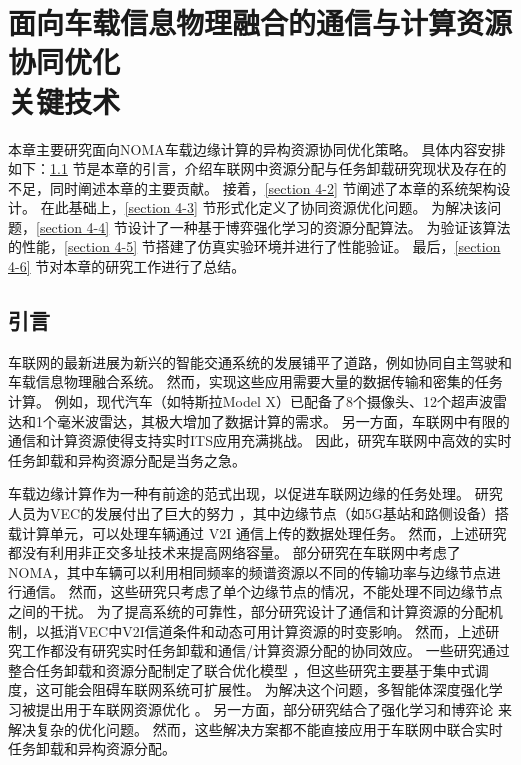 \chapter[面向车载信息物理融合的通信与计算资源协同优化关键技术]{面向车载信息物理融合的通信与计算资源协同优化\\关键技术}
本章主要研究面向NOMA车载边缘计算的异构资源协同优化策略。
具体内容安排如下：\ref{section 4-1} 节是本章的引言，介绍车联网中资源分配与任务卸载研究现状及存在的不足，同时阐述本章的主要贡献。
接着，\ref{section 4-2} 节阐述了本章的系统架构设计。
在此基础上，\ref{section 4-3} 节形式化定义了协同资源优化问题。
为解决该问题，\ref{section 4-4} 节设计了一种基于博弈强化学习的资源分配算法。
为验证该算法的性能，\ref{section 4-5} 节搭建了仿真实验环境并进行了性能验证。
最后，\ref{section 4-6} 节对本章的研究工作进行了总结。
\section{引言}\label{section 4-1}

车联网的最新进展为新兴的智能交通系统的发展铺平了道路，例如协同自主驾驶\cite{bagheri20215g}和车载信息物理融合系统\cite{mugabarigira2023context}。
然而，实现这些应用需要大量的数据传输和密集的任务计算。
例如，现代汽车（如特斯拉Model X）已配备了8个摄像头、12个超声波雷达和1个毫米波雷达，其极大增加了数据计算的需求。
另一方面，车联网中有限的通信和计算资源使得支持实时ITS应用充满挑战。
因此，研究车联网中高效的实时任务卸载和异构资源分配是当务之急。

车载边缘计算\cite{lang2022cooperative}作为一种有前途的范式出现，以促进车联网边缘的任务处理。
研究人员为VEC的发展付出了巨大的努力 \cite{liu2021fog, dai2021edge, zhang2022digital, liu2020adaptive, liu2018coding}，其中边缘节点（如5G基站和路侧设备）搭载计算单元，可以处理车辆通过 V2I 通信上传的数据处理任务。
然而，上述研究都没有利用非正交多址\cite{islam2017power}技术来提高网络容量。
部分研究在车联网中考虑了NOMA\cite{patel2021performance, zhang2021centralized, zhu2021decentralized, liu2019energy}，其中车辆可以利用相同频率的频谱资源以不同的传输功率与边缘节点进行通信。
然而，这些研究只考虑了单个边缘节点的情况，不能处理不同边缘节点之间的干扰。
为了提高系统的可靠性，部分研究设计了通信和计算资源的分配机制，以抵消VEC中V2I信道条件和动态可用计算资源的时变影响\cite{liu2021rtds, liu2022a, chen2020robust, liu2014temporal, liu2016cooperative}。
然而，上述研究工作都没有研究实时任务卸载和通信/计算资源分配的协同效应。
一些研究通过整合任务卸载和资源分配制定了联合优化模型 \cite{dai2021asynchronous, dai2022a}，但这些研究主要基于集中式调度，这可能会阻碍车联网系统可扩展性。
为解决这个问题，多智能体深度强化学习\cite{kumar2022multi}被提出用于车联网资源优化 \cite{alam2022multi, zhang2021adaptive, nie2021semi}。
另一方面，部分研究结合了强化学习和博弈论 \cite{zheng2022stackelberg, albaba2021driver, rajeswaran2020a}来解决复杂的优化问题。
然而，这些解决方案都不能直接应用于车联网中联合实时任务卸载和异构资源分配。

